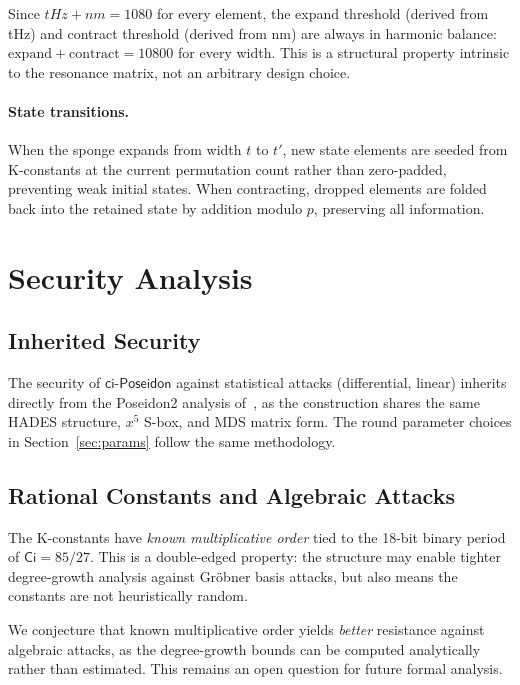 \documentclass[preprint]{iacrtrans}
\newcommand{\Ci}{\ensuremath{\mathsf{Ci}}}
\newcommand{\ciposeidon}{\ensuremath{\mathsf{ci\text{-}Poseidon}}}
\begin{document}
Since $\mathit{tHz} + \mathit{nm} = 1080$ for every element, the expand
threshold (derived from tHz) and contract threshold (derived from nm) are
always in harmonic balance: $\text{expand} + \text{contract} = 10800$ for
every width. This is a structural property intrinsic to the resonance matrix,
not an arbitrary design choice.

\paragraph{State transitions.} When the sponge expands from width $t$ to
$t'$, new state elements are seeded from K-constants at the current
permutation count rather than zero-padded, preventing weak initial states.
When contracting, dropped elements are folded back into the retained state
by addition modulo $p$, preserving all information.

\section{Security Analysis}

\subsection{Inherited Security}

The security of \ciposeidon{} against statistical attacks (differential,
linear) inherits directly from the Poseidon2 analysis of~\cite{GKRRS23},
as the construction shares the same HADES structure, $x^5$ S-box, and
MDS matrix form. The round parameter choices in Section~\ref{sec:params}
follow the same methodology.

\subsection{Rational Constants and Algebraic Attacks}

The K-constants have \emph{known multiplicative order} tied to the 18-bit
binary period of $\Ci = 85/27$. This is a double-edged property: the
structure may enable tighter degree-growth analysis against Gröbner basis
attacks, but also means the constants are not heuristically random.

We conjecture that known multiplicative order yields \emph{better} resistance
against algebraic attacks, as the degree-growth bounds can be computed
analytically rather than estimated. This remains an open question for future
formal analysis.
\end{document}
